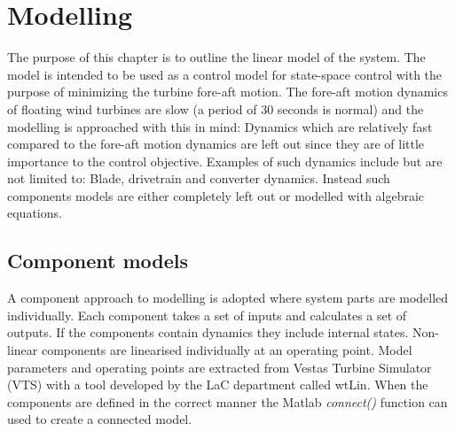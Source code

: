 \section{Modelling} \label{sec:mod} %
The purpose of this chapter is to outline the linear model of the system. The model is intended to be used as a control model for state-space control with the purpose of minimizing the turbine fore-aft motion. The fore-aft motion dynamics of floating wind turbines are slow (a period of 30 seconds is normal) and the modelling is approached with this in mind: Dynamics which are relatively fast compared to the fore-aft motion dynamics are left out since they are of little importance to the control objective. Examples of such dynamics include but are not limited to: Blade, drivetrain and converter dynamics. Instead such components models are either completely left out or modelled with algebraic equations. 




%
%


\subsection{Component models} \label{sec:comp}
A component approach to modelling is adopted where system parts are modelled individually. Each component takes a set of inputs and calculates a set of outputs. If the components contain dynamics they include internal states. Non-linear components are linearised individually at an operating point. Model parameters and operating points are extracted from Vestas Turbine Simulator (VTS) with a tool developed by the LaC department called wtLin. When the components are defined in the correct manner the Matlab \textit{connect()} function can used to create a connected model.


